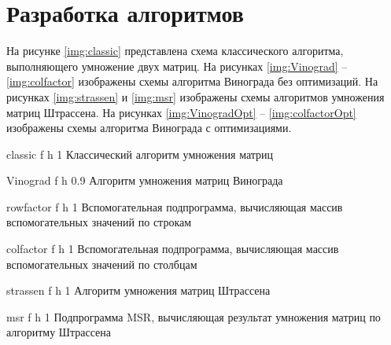 \section{Разработка алгоритмов}

На рисунке \ref{img:classic} представлена схема классического алгоритма, выполняющего умножение двух матриц. 
На рисунках \ref{img:Vinograd} -- \ref{img:colfactor} изображены схемы алгоритма Винограда без оптимизаций. 
На рисунках \ref{img:strassen} и \ref{img:msr} изображены схемы алгоритмов умножения матриц Штрассена.  
На рисунках \ref{img:VinogradOpt} -- \ref{img:colfactorOpt} изображены схемы алгоритма Винограда с оптимизациями.

\clearpage

{classic} %
{f} %
{h} %
{1\textwidth} %
{Классический алгоритм умножения матриц} %


{Vinograd} %
{f} %
{h} %
{0.9\textwidth} %
{Алгоритм умножения матриц Винограда} %

{rowfactor} %
{f} %
{h} %
{1\textwidth} %
{Вспомогательная подпрограмма, вычисляющая массив вспомогательных значений по строкам} %

{colfactor} %
{f} %
{h} %
{1\textwidth} %
{Вспомогательная подпрограмма, вычисляющая массив вспомогательных значений по столбцам} %

{strassen} %
{f} %
{h} %
{1\textwidth} %
{Алгоритм умножения матриц Штрассена} %

{msr} %
{f} %
{h} %
{1\textwidth} %
{Подпрограмма MSR, вычисляющая результат умножения матриц по алгоритму Штрассена} %

